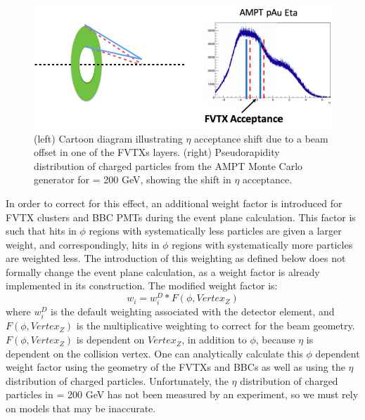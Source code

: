 \begin{figure}[!ht]
\begin{center}
\includegraphics[width=0.95\linewidth]{figs/tilt_effect.png}
\caption{(left) Cartoon diagram illustrating $\eta$ acceptance shift due to a beam offset in one of the FVTXs layers. (right) Pseudorapidity distribution of charged particles from the AMPT Monte Carlo generator for \pau \sqsn = 200 GeV, showing the shift in $\eta$ acceptance.}
\label{fig:tilt_effect}
\end{center}
\end{figure}

In order to correct for this effect, an additional weight factor is introduced for FVTX clusters and BBC PMTs during the event plane calculation. This factor is such that hits in $\phi$ regions with systematically less particles are given a larger weight, and correspondingly, hits in $\phi$ regions with systematically more particles are weighted less. The introduction of this weighting as defined below does not formally change the event plane calculation, as a weight factor is already implemented in its construction. The modified weight factor is:
\begin{equation}
w_i = w^D_i*F(\phi,Vertex_Z)
\label{eqn:modified_weight}
\end{equation}
where $w^D_i$ is the default weighting associated with the detector element, and $F(\phi,Vertex_Z)$ is the multiplicative weighting to correct for the beam geometry. $F(\phi,Vertex_Z)$ is dependent on $Vertex_Z$, in addition to $\phi$, because $\eta$ is dependent on the collision vertex. One can analytically calculate this $\phi$ dependent weight factor using the geometry of the FVTXs and BBCs as well as using the $\eta$ distribution of charged particles. Unfortunately, the $\eta$ distribution of charged particles in \pau \sqsn = 200 GeV has not been measured by an experiment, so we must rely on models that may be inaccurate.

